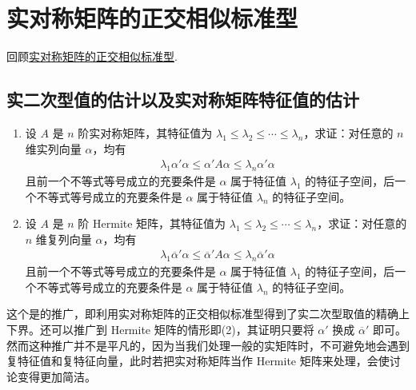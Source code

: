\documentclass[../../main.tex]{subfiles}%
\begin{document}
\section{实对称矩阵的正交相似标准型}

回顾\hyperref[theorem:实对称和Hermite矩阵的正交对角化]{实对称矩阵的正交相似标准型}.

\subsection{实二次型值的估计以及实对称矩阵特征值的估计}

\begin{proposition}\label{proposition:例9.52}
\begin{enumerate}[(1)]
\item 设 \(A\) 是 \(n\) 阶实对称矩阵，其特征值为 \(\lambda_1 \leqslant  \lambda_2 \leqslant  \cdots \leqslant  \lambda_n\)，求证：对任意的 \(n\) 维实列向量 \(\alpha\)，均有
\begin{align*}
\lambda_1\alpha'\alpha \leqslant  \alpha'A\alpha \leqslant  \lambda_n\alpha'\alpha
\end{align*}
且前一个不等式等号成立的充要条件是 \(\alpha\) 属于特征值 \(\lambda_1\) 的特征子空间，后一个不等式等号成立的充要条件是 \(\alpha\) 属于特征值 \(\lambda_n\) 的特征子空间。

\item 设 \(A\) 是 \(n\) 阶 Hermite 矩阵，其特征值为 \(\lambda_1 \leqslant  \lambda_2 \leqslant  \cdots \leqslant  \lambda_n\)，求证：对任意的 \(n\) 维复列向量 \(\alpha\)，均有
\begin{align*}
\lambda_1\overline{\alpha}'\alpha \leqslant  \overline{\alpha}'A\alpha \leqslant  \lambda_n\overline{\alpha}'\alpha
\end{align*}
且前一个不等式等号成立的充要条件是 \(\alpha\) 属于特征值 \(\lambda_1\) 的特征子空间，后一个不等式等号成立的充要条件是 \(\alpha\) 属于特征值 \(\lambda_n\) 的特征子空间。
\end{enumerate}
\end{proposition}
\begin{remark}
这个是的推广，即利用实对称矩阵的正交相似标准型得到了实二次型取值的精确上下界。还可以推广到 Hermite 矩阵的情形即(2)，其证明只要将 \(\alpha'\) 换成 \(\overline{\alpha}'\) 即可。然而这种推广并不是平凡的，因为当我们处理一般的实矩阵时，不可避免地会遇到复特征值和复特征向量，此时若把实对称矩阵当作 Hermite 矩阵来处理，会使讨论变得更加简洁。
\end{remark}
\end{document}
